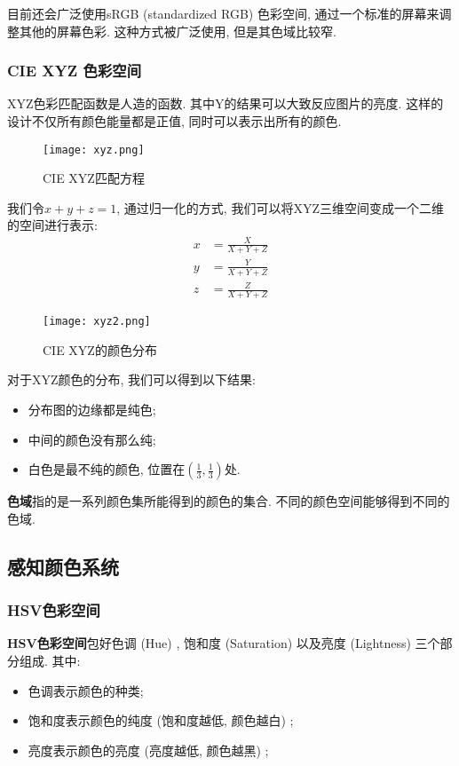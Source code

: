 目前还会广泛使用sRGB (standardized RGB) 色彩空间, 通过一个标准的屏幕来调整其他的屏幕色彩. 这种方式被广泛使用, 但是其色域比较窄. 

\subsubsection{CIE XYZ 色彩空间}

XYZ色彩匹配函数是人造的函数. 其中Y的结果可以大致反应图片的亮度. 这样的设计不仅所有颜色能量都是正值, 同时可以表示出所有的颜色. 

\begin{figure}[H]
	\centering
	\texttt{[image: xyz.png]}
	\caption{CIE XYZ匹配方程}
	\label{fig:xyz}
\end{figure}

我们令$x+y+z=1$, 通过归一化的方式, 我们可以将XYZ三维空间变成一个二维的空间进行表示: 
\begin{equation}
	\begin{split}
		x &=\frac{X}{X+Y+Z} \\
		y &=\frac{Y}{X+Y+Z} \\
		z &=\frac{Z}{X+Y+Z}
	\end{split}
\end{equation}

\begin{figure}[H]
	\centering
	\texttt{[image: xyz2.png]}
	\caption{CIE XYZ的颜色分布}
	\label{fig:xyz2}
\end{figure}

对于XYZ颜色的分布, 我们可以得到以下结果: 
\begin{itemize}
	\item 分布图的边缘都是纯色; 
	\item 中间的颜色没有那么纯; 
	\item 白色是最不纯的颜色, 位置在$(\frac{1}{3},\frac{1}{3})$处. 
\end{itemize}

\textbf{色域}指的是一系列颜色集所能得到的颜色的集合. 不同的颜色空间能够得到不同的色域. 

\subsection{感知颜色系统}

\subsubsection{HSV色彩空间}

\textbf{HSV色彩空间}包好色调 (Hue) , 饱和度 (Saturation) 以及亮度 (Lightness) 三个部分组成. 其中: 
\begin{itemize}
	\item 色调表示颜色的种类; 
	\item 饱和度表示颜色的纯度 (饱和度越低, 颜色越白) ; 
	\item 亮度表示颜色的亮度 (亮度越低, 颜色越黑) ; 
\end{itemize}

